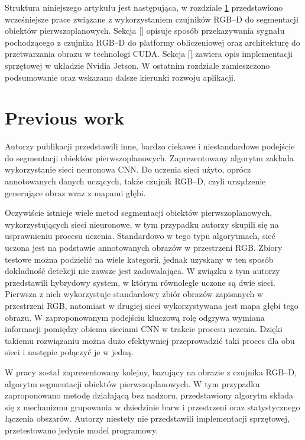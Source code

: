 \documentclass[b5paper,10pt,twoside]{article}
\begin{document}
{Struktura niniejszego artykułu jest następująca, w rozdziale \ref{sec:prev_work} przedstawiono wcześniejsze prace związane z wykorzystaniem czujników RGB--D do segmentacji obiektów pierwszoplanowych. Sekcja \ref{} opisuje sposób przekazywania sygnału pochodzącego z czujnika RGB--D do platformy obliczeniowej oraz architekturę do przetwarzania obrazu w technologi CUDA. Sekcja \ref{} zawiera opis implementacji sprzętowej w układzie Nvidia Jetson. W ostatnim rozdziale zamieszczono podsumowanie oraz wskazano dalsze kierunki rozwoju aplikacji.   

\section{Previous work}
\label{sec:prev_work}


Autorzy publikacji \cite{Hoffman_2016} przedstawili inne, bardzo ciekawe i niestandardowe podejście do segmentacji obiektów pierwszoplanowych. 
Zaprezentowany algorytm zakłada wykorzystanie sieci neuronowa CNN. 
Do uczenia sieci użyto, oprócz annotowanych danych uczących, także czujnik RGB--D, czyli urządzenie generujące obraz wraz z mapami głębi. 

Oczywiście istnieje wiele metod segmentacji obiektów pierwszoplanowych, wykorzystujących sieci nieuronowe, w tym przypadku autorzy skupili się na usprawnieniu procesu uczenia. 
Standardowo w tego typu algorytmach, sieć uczona jest na podstawie annotowanych obrazów w przestrzeni RGB. 
Zbiory testowe można podzielić na wiele kategorii, jednak uzyskany w ten sposób dokładność detekcji nie zawsze jest zadowalająca. 
W związku z tym autorzy przedstawili hybrydowy system, w którym równolegle uczone są dwie sieci. 
Pierwsza z nich wykorzystuje standardowy zbiór obrazów zapisanych w przestrzeni RGB, natomiast w drugiej sieci wykorzystywana jest mapa głębi tego obrazu. W zaproponowanym podejściu kluczową rolę odgrywa wymiana informacji pomiędzy obiema sieciami CNN w trakcie procesu uczenia. 
Dzięki takiemu rozwiązaniu można dużo efektywniej przeprowadzić taki proces dla obu sieci i następie połączyć je w jedną. 

W pracy \cite{Hasnat_2014} został zaprezentowany kolejny, bazujący na obrazie z czujnika RGB--D, algorytm segmentacji obiektów pierwszoplanowych. 
W tym przypadku zaproponowano metodę działającą bez nadzoru, przedstawiony algorytm składa się z mechanizmu grupowania w dziedzinie barw i przestrzeni oraz statystycznego łączenia obszarów. 
Autorzy niestety nie przedstawili implementacji sprzętowej, przetestowano jedynie model programowy.

}
\end{document}
